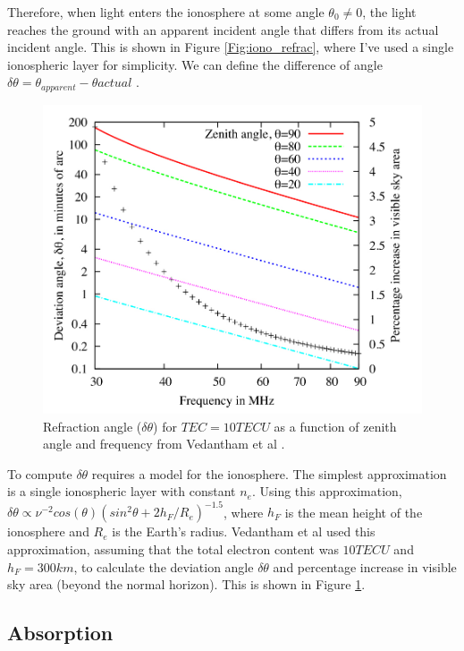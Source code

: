 Therefore, when light enters the ionosphere at some angle $\theta_0 \neq 0$, the light reaches the ground with an apparent incident angle that differs from its actual incident angle. This is shown in Figure \ref{Fig:iono_refrac}, where I've used a single ionospheric layer for simplicity. We can define the difference of angle $\delta \theta = \theta_{apparent}-\theta{actual}$ \cite{thompson_2001}.


\begin{figure}[htb]
\begin{center}
\includegraphics[width=0.95\linewidth]{Ionosphere/figures/refraction_impact.jpg}
\caption{Refraction angle ($\delta \theta$) for $TEC= 10 TECU$ as a function of zenith angle and frequency from Vedantham et al \cite{vedantham_2014}.}
\label{Fig:refrac_est}
\end{center}
\end{figure} 

To compute $\delta \theta$ requires a model for the ionosphere. The simplest approximation is a single ionospheric layer with constant $n_e$. Using this approximation, $\delta \theta \propto \nu^{-2} cos(\theta)(sin^2 \theta + 2 h_F/R_e)^{-1.5}$, where $h_F$ is the mean height of the ionosphere and $R_e$ is the Earth's radius. Vedantham et al \cite{vedantham_2014} used this approximation, assuming that the total electron content was $10 TECU$ and $h_F = 300 km$, to calculate the deviation angle $\delta \theta$ and percentage increase in visible sky area (beyond the normal horizon). This is shown in Figure \ref{Fig:refrac_est}. 


\subsection{Absorption}


